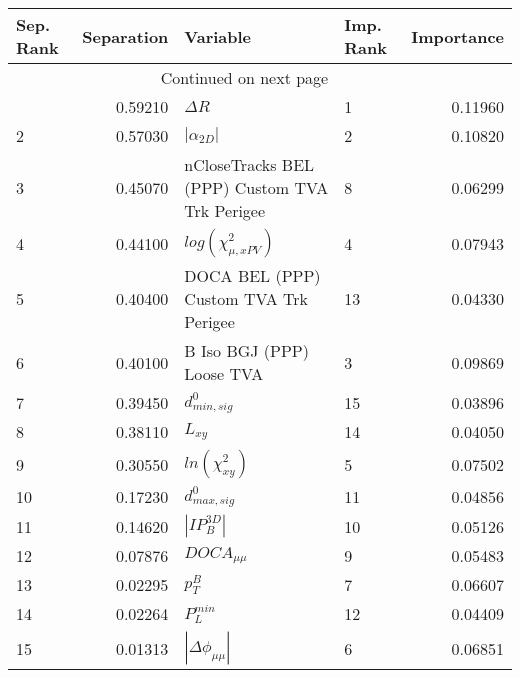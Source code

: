 \usepackage{lscape}

\begin{landscape}
\begin{longtable}{lrllr}
\toprule
Sep. Rank &  Separation &                                       Variable & Imp. Rank &  Importance \\
\midrule
\endhead
\midrule
\multicolumn{3}{r}{{Continued on next page}} \\
\midrule
\endfoot

\bottomrule
\endlastfoot
        1 &     0.59210 &                                     $\Delta R$ &         1 &     0.11960 \\
        2 &     0.57030 &                                $|\alpha_{2D}|$ &         2 &     0.10820 \\
        3 &     0.45070 &  nCloseTracks BEL (PPP) Custom TVA Trk Perigee &         8 &     0.06299 \\
        4 &     0.44100 &                      $log(\chi^{2}_{\mu,xPV})$ &         4 &     0.07943 \\
        5 &     0.40400 &          DOCA BEL (PPP) Custom TVA Trk Perigee &        13 &     0.04330 \\
        6 &     0.40100 &                      B Iso BGJ (PPP) Loose TVA &         3 &     0.09869 \\
        7 &     0.39450 &                               $d^0_{min, sig}$ &        15 &     0.03896 \\
        8 &     0.38110 &                                       $L_{xy}$ &        14 &     0.04050 \\
        9 &     0.30550 &                            $ln(\chi^{2}_{xy})$ &         5 &     0.07502 \\
       10 &     0.17230 &                               $d^0_{max, sig}$ &        11 &     0.04856 \\
       11 &     0.14620 &                                $|IP_{B}^{3D}|$ &        10 &     0.05126 \\
       12 &     0.07876 &                                $DOCA_{\mu\mu}$ &         9 &     0.05483 \\
       13 &     0.02295 &                                      $p^B_{T}$ &         7 &     0.06607 \\
       14 &     0.02264 &                                  $P^{min}_{L}$ &        12 &     0.04409 \\
       15 &     0.01313 &                       $|\Delta \phi_{\mu\mu}|$ &         6 &     0.06851 \\
\end{longtable}

\end{landscape}
